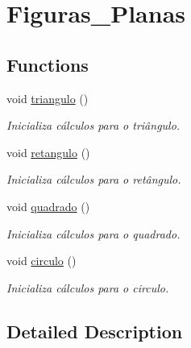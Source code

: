 \hypertarget{group__Figuras__Planas}{}\section{Figuras\+\_\+\+Planas}
\label{group__Figuras__Planas}
\subsection*{Functions}
\begin{DoxyCompactItemize}
\item 
void \hyperlink{group__Figuras__Planas_ga8928cef04d4cd48e92adf3569f6d185b}{triangulo} ()\hypertarget{group__Figuras__Planas_ga8928cef04d4cd48e92adf3569f6d185b}{}\label{group__Figuras__Planas_ga8928cef04d4cd48e92adf3569f6d185b}

\begin{DoxyCompactList}\small\item\em Inicializa cálculos para o triângulo. \end{DoxyCompactList}\item 
void \hyperlink{group__Figuras__Planas_gafa7da114af5845aed90385aaad07745f}{retangulo} ()\hypertarget{group__Figuras__Planas_gafa7da114af5845aed90385aaad07745f}{}\label{group__Figuras__Planas_gafa7da114af5845aed90385aaad07745f}

\begin{DoxyCompactList}\small\item\em Inicializa cálculos para o retângulo. \end{DoxyCompactList}\item 
void \hyperlink{group__Figuras__Planas_ga59a769deb5a89245b0b2a7760179708e}{quadrado} ()\hypertarget{group__Figuras__Planas_ga59a769deb5a89245b0b2a7760179708e}{}\label{group__Figuras__Planas_ga59a769deb5a89245b0b2a7760179708e}

\begin{DoxyCompactList}\small\item\em Inicializa cálculos para o quadrado. \end{DoxyCompactList}\item 
void \hyperlink{group__Figuras__Planas_ga28482bc381ce414df86e4fdb9e3e6da5}{circulo} ()\hypertarget{group__Figuras__Planas_ga28482bc381ce414df86e4fdb9e3e6da5}{}\label{group__Figuras__Planas_ga28482bc381ce414df86e4fdb9e3e6da5}

\begin{DoxyCompactList}\small\item\em Inicializa cálculos para o circulo. \end{DoxyCompactList}\end{DoxyCompactItemize}


\subsection{Detailed Description}
